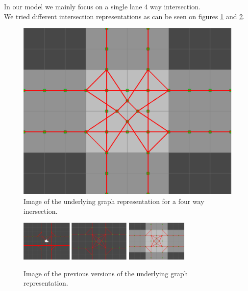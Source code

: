 In our model we mainly focus on a single lane 4 way intersection.\\ We tried different intersection representations as can be seen on figures \ref{figure:graph} and \ref{figure:graphs}.
\begin{figure}
\centering
\includegraphics[scale=.4]{img/graph.png}
\caption{Image of the underlying graph representation for a four way inersection.}
\label{figure:graph}
\end{figure}

\begin{figure}
\centering
\includegraphics[height=75px]{img/graph-old1.png}
\includegraphics[height=75px]{img/graph-old2.png}
\includegraphics[height=75px]{img/graph-old3.png}
\caption{Image of the previous versions of the underlying graph representation.}
\label{figure:graphs}
\end{figure}

